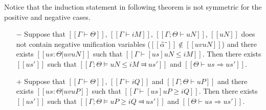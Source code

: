 Notice that the induction statement in following theorem is not symmetric for the positive and negative cases.
\begin{theorem}
    \hfill
    \begin{itemize}
        \item [$-$] Suppose that $[[Γ ⊢ Θ]]$, $[[Γ ⊢ iM]]$, $[[Γ ; Θ ⊢ uN]]$,
        $[[uN]]$ does not contain negative unification variables ($[[α̂⁻]] \notin [[uv uN]]$)
        and there exists $[[us : Θ | uv uN]]$ such that $[[ Γ ⊢ [us]uN ≤ iM ]]$.
        Then there exists $[[us']]$ such that $[[Γ ; Θ ⊨ uN ≤ iM ⫤ us']]$
        and $[[Θ ⊢ us ⇒ us']]$.
        
        \item [$+$] Suppose that $[[Γ ⊢ Θ]]$, $[[Γ ⊢ iQ]]$ and $[[Γ ; Θ ⊢ uP]]$ and
        there exists $[[us : Θ | uv uP]]$ such that $[[ Γ ⊢ [us]uP ≥ iQ ]]$.
        Then there exists $[[us']]$ such that $[[Γ ; Θ ⊨ uP ≥ iQ ⫤ us']]$
        and $[[Θ ⊢ us ⇒ us']]$.
    \end{itemize}
\end{theorem}
